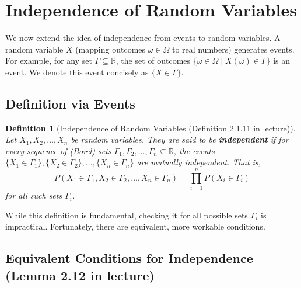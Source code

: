 \documentclass[11pt]{article}
\newtheorem{definition}[theorem]{Definition}
\begin{document}
\section{Independence of Random Variables}

We now extend the idea of independence from events to random variables. A random variable $X$ (mapping outcomes $\omega \in \Omega$ to real numbers) generates events. For example, for any set $\Gamma \subseteq \mathbb{R}$, the set of outcomes $\{\omega \in \Omega \mid X(\omega) \in \Gamma\}$ is an event. We denote this event concisely as $\{X \in \Gamma\}$.

\subsection{Definition via Events}
\begin{definition}[Independence of Random Variables (Definition 2.1.11 in lecture)]
Let $X_1, X_2, \dots, X_n$ be random variables. They are said to be \textbf{independent} if for every sequence of (Borel) sets $\Gamma_1, \Gamma_2, \dots, \Gamma_n \subseteq \mathbb{R}$, the events $\{X_1 \in \Gamma_1\}, \{X_2 \in \Gamma_2\}, \dots, \{X_n \in \Gamma_n\}$ are mutually independent.
That is,
\begin{equation}
P(X_1 \in \Gamma_1, X_2 \in \Gamma_2, \dots, X_n \in \Gamma_n) = \prod_{i=1}^n P(X_i \in \Gamma_i)
\end{equation}
for all such sets $\Gamma_i$.
\end{definition}

While this definition is fundamental, checking it for all possible sets $\Gamma_i$ is impractical. Fortunately, there are equivalent, more workable conditions.

\subsection{Equivalent Conditions for Independence (Lemma 2.12 in lecture)}
\end{document}

